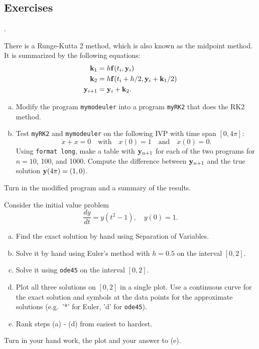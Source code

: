
\subsection*{Exercises}

\begin{list}
{.}{}


\item There is a Runge-Kutta 2 method, which is also known as the
  midpoint method.  It is summarized by the following equations:
\begin{equation}
\begin{split}
\mathbf{k}_1 &= h \mathbf{f}(t_i,\mathbf{y}_i) \\
\mathbf{k}_2 &= h \mathbf{f}(t_i+h/2, \mathbf{y}_i + \mathbf{k}_1/2) \\
\mathbf{y}_{i+1} &= \mathbf{y}_i + \mathbf{k}_2.
\end{split}
\end{equation}
\begin{enumerate}[(a)]
\item Modify the program \verb&mymodeuler& into a program \verb&myRK2& that
does the RK2 method. 
\item
Test \verb&myRK2& and \verb&mymodeuler& on the
following IVP with time span $[0, 4\pi]$:
$$
     \ddot{x} + x = 0
     \quad\text{with}\quad x(0) = 1\quad\text{and}\quad \dot{x}(0) = 0.
$$
Using \verb&format long&, make a table with \(\mathbf{y}_{n+1}\) for each of the two programs for
$n = 10$, 100, and 1000. Compute the difference between \(\mathbf{y}_{n+1}\) and the true solution
$\mathbf{y}(4\pi)=(1,0)$.
\end{enumerate}
Turn in the modified program and a summary of the results.

\item Consider the initial value problem
\[
  \frac{dy}{dt} = y(t^2-1), \quad y(0)=1.
\]
\begin{enumerate}[(a)]
\item Find the exact solution by hand using Separation of Variables.
\item Solve it by hand using Euler's method  with $h = 0.5$ on the interval $[0,2]$.
\item Solve it using \verb&ode45& on the interval $[0, 2]$.
\item Plot all three solutions on $[0,2]$ in a single plot. Use a continuous curve for the exact solution and symbols at 
the data points for the approximate solutions (e.g.\ '*' for Euler, 'd' for \verb&ode45&).
\item Rank steps (a) - (d) from easiest to hardest.
\end{enumerate}
Turn in your hand work, the plot and your answer to (e). 

\end{list}



